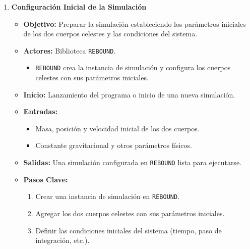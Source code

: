 \begin{enumerate}
    \item \textbf{Configuración Inicial de la Simulación}
        \begin{itemize}
            \item \textbf{Objetivo:} Preparar la simulación estableciendo los parámetros iniciales de los dos cuerpos celestes y las condiciones del sistema.
            \item \textbf{Actores:} Biblioteca \texttt{REBOUND}.
                \begin{itemize}
                    \item \texttt{REBOUND} crea la instancia de simulación y configura los cuerpos celestes con sus parámetros iniciales.
                \end{itemize}
            \item \textbf{Inicio:} Lanzamiento del programa o inicio de una nueva simulación.
            \item \textbf{Entradas:}
                \begin{itemize}
                    \item Masa, posición y velocidad inicial de los dos cuerpos.
                    \item Constante gravitacional y otros parámetros físicos.
                \end{itemize}
            \item \textbf{Salidas:} Una simulación configurada en \texttt{REBOUND} lista para ejecutarse.
            \item \textbf{Pasos Clave:}
                \begin{enumerate}
                    \item Crear una instancia de simulación en \texttt{REBOUND}.
                    \item Agregar los dos cuerpos celestes con sus parámetros iniciales.
                    \item Definir las condiciones iniciales del sistema (tiempo, paso de integración, etc.).
                \end{enumerate}
        \end{itemize}


\end{enumerate}
